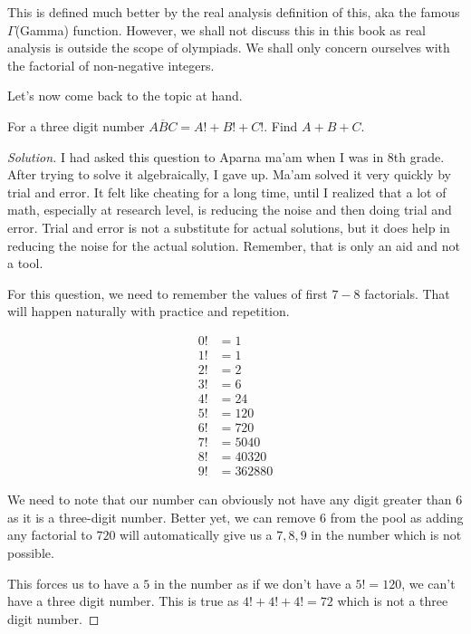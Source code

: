 This is defined much better by the real analysis definition of this, aka the famous \(\Gamma\)(Gamma) function. 
However, we shall not discuss this in this book as real analysis is outside the scope of
olympiads. We shall only concern ourselves with the factorial of non-negative integers.

Let's now come back to the topic at hand.

\begin{example}
For a three digit number \(\overline{ABC} = A!+B!+C!\). Find \(A+B+C\).
\end{example}

\begin{proof}
    [Solution]
    I had asked this question to Aparna ma'am when I was in 8th grade. After trying to solve it algebraically, 
    I gave up. Ma'am solved it very quickly by trial and error. It felt like cheating for a long time, 
    until I realized that a lot of math, especially at research level, is reducing the noise and then doing 
    trial and error. Trial and error is not a substitute for actual solutions, but it does
    help in reducing the noise for the actual solution. Remember, that is only an aid and not a tool.

    For this question, we need to remember the values of first \(7-8\) factorials. 
    That will happen naturally with practice and repetition.
    
    \begin{align*}
        0! &= 1\\
        1! &= 1 \\
        2! &= 2\\
        3! &= 6\\
        4! &= 24\\
        5! &= 120\\
        6! &= 720\\
        7! &= 5040\\
        8! &= 40320\\
        9! &= 362880
    \end{align*}

    We need to note that our number can obviously not have any digit greater than \(6\) as it is a
    three-digit number. Better yet, we can remove \(6\) from the pool as adding any factorial to \(720\) will 
    automatically give us a \(7,8,9\) in the number which is not possible.

    This forces us to have a \(5\) in the number as if we don't have a \(5!=120\), we can't have a three 
    digit number. This is true as \(4!+4!+4!=72\) which is not a three digit number.


\end{proof}
